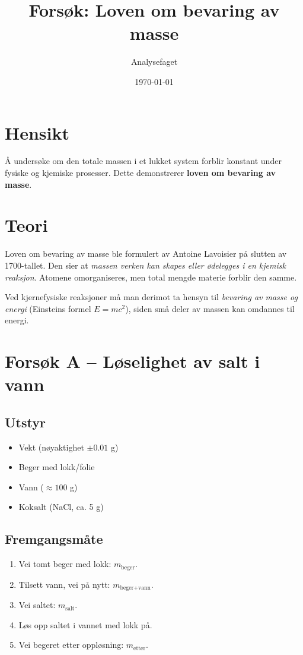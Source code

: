 \documentclass[a4paper,12pt]{article}
\title{Forsøk: Loven om bevaring av masse}
\author{Analysefaget}
\date{\today}
\begin{document}
\maketitle

\section{Hensikt}
Å undersøke om den totale massen i et lukket system forblir konstant under fysiske og kjemiske prosesser. Dette demonstrerer \textbf{loven om bevaring av masse}.

\section{Teori}
Loven om bevaring av masse ble formulert av Antoine Lavoisier på slutten av 1700-tallet. Den sier at \emph{massen verken kan skapes eller ødelegges i en kjemisk reaksjon}. Atomene omorganiseres, men total mengde materie forblir den samme.

Ved kjernefysiske reaksjoner må man derimot ta hensyn til \emph{bevaring av masse og energi} (Einsteins formel $E = mc^2$), siden små deler av massen kan omdannes til energi.

\section{Forsøk A – Løselighet av salt i vann}
\subsection*{Utstyr}
\begin{itemize}
  \item Vekt (nøyaktighet $\pm 0.01$ g)
  \item Beger med lokk/folie
  \item Vann ($\approx 100$ g)
  \item Koksalt (NaCl, ca. 5 g)
\end{itemize}

\subsection*{Fremgangsmåte}
\begin{enumerate}
  \item Vei tomt beger med lokk: $m_\text{beger}$.
  \item Tilsett vann, vei på nytt: $m_\text{beger+vann}$.
  \item Vei saltet: $m_\text{salt}$.
  \item Løs opp saltet i vannet med lokk på.
  \item Vei begeret etter oppløsning: $m_\text{etter}$.
\end{enumerate}
\end{document}
